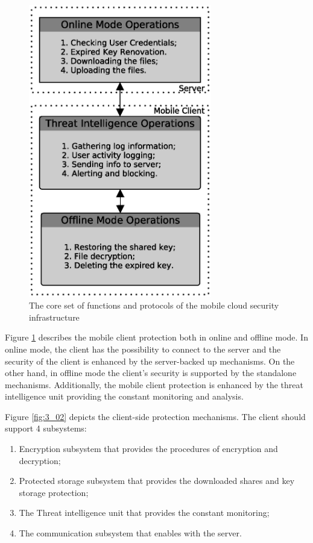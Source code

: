 \begin{figure}[h!]
	\centering
	\includegraphics[width=8cm]{figs/ch3/fig01.eps}
	\caption{The core set of functions and protocols of the mobile cloud security infrastructure}
	\label{fig:3_01}
\end{figure}

Figure \ref{fig:3_01} describes the mobile client protection both in online and offline mode. In online mode, the client has the possibility to connect to the server and the security of the client is enhanced by the server-backed up mechanisms. On the other hand, in offline mode the client’s security is supported by the standalone mechanisms. Additionally, the mobile client protection is enhanced by the threat intelligence unit providing the constant monitoring and analysis.

Figure \ref{fig:3_02} depicts the client-side protection mechanisms. The client should support 4 subsystems: 
\begin{enumerate}
	\item Encryption subsystem that provides the procedures of encryption and decryption;
	\item Protected storage subsystem that provides the downloaded shares and key storage protection;
	\item The Threat intelligence unit that provides the constant monitoring;
	\item The communication subsystem that enables with the server.
\end{enumerate}

